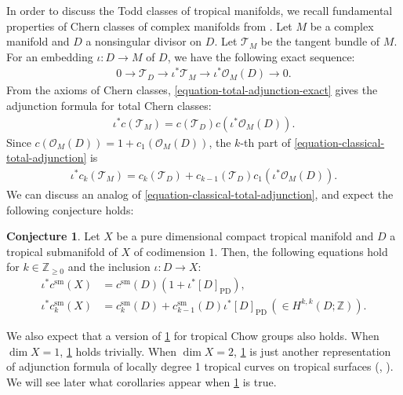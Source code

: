 \documentclass[a4paper,dvipdfmx,reqno,12pt]{amsart}
\theoremstyle{definition}
\newtheorem{conjecture}[theorem]{Conjecture}
\newcommand{\PD}[1]{[#1]_{\mathrm{PD}}}
\numberwithin{equation}{section}
\begin{document}
In order to discuss the Todd classes of
tropical manifolds, we recall fundamental properties
of Chern classes of complex manifolds from
\cite{MR1335917,MR1644323,MR2810322}.
Let $M$ be a complex manifold and 
$D$ a nonsingular
divisor on $D$. Let $\mathcal{T}_M$ be the tangent
bundle of $M$.
For an embedding $\iota\colon D\to M$ of
$D$, we have the following
exact sequence: 
\begin{align}
\label{equation-total-adjunction-exact}
0 \to \mathcal{T}_{D}\to \iota^{*}\mathcal{T}_M
\to \iota^{*}\mathcal{O}_M(D)\to 0.
\end{align}
From the axioms of Chern classes,
\eqref{equation-total-adjunction-exact} gives 
the adjunction formula for total Chern classes:
\begin{align}
\label{equation-classical-total-adjunction}
\iota^{*}c(\mathcal{T}_M)
=c(\mathcal{T}_{D})c(\iota^{*}\mathcal{O}_M(D)).
\end{align}
Since $c(\mathcal{O}_M(D))=1+c_1(\mathcal{O}_M(D))$, 
the $k$-th part of \eqref{equation-classical-total-adjunction}
is
\begin{align}
\label{equation-classical-total-adjunction-2}
\iota^{*}c_k(\mathcal{T}_M)
=c_{k}(\mathcal{T}_{D})+
c_{k-1}(\mathcal{T}_{D})c_1(\iota^{*}\mathcal{O}_M(D)).
\end{align}
We can discuss an analog of 
\eqref{equation-classical-total-adjunction},
and expect the following conjecture holds:
\begin{conjecture}
\label{conjecture-grr-divisor}
Let $X$ be a pure dimensional compact tropical manifold
and $D$ a tropical submanifold of $X$ of codimension $1$.
Then, the following equations hold for 
$k\in \mathbb{Z}_{\geq 0}$ and the inclusion 
$\iota\colon D \to X$:
\begin{align}
\label{equation-total-adjunction}
\iota^{*}c^{\mathrm{sm}}(X)&=c^{\mathrm{sm}}(D)
(1+\iota^{*}\PD{D}), \\ 
\iota^{*}c^{\mathrm{sm}}_k(X)&=c^{\mathrm{sm}}_k(D)+
c^{\mathrm{sm}}_{k-1}(D)\iota^{*}\PD{D} \,
(\in H^{k,k}(D;\mathbb{Z})).
\end{align}
\end{conjecture}
We also expect that a version
of \cref{conjecture-grr-divisor} for tropical
Chow groups \cite[Definition 3.30]{shaw2015tropical}
also holds.
When $\dim X=1$, \cref{conjecture-grr-divisor} holds
trivially. When $\dim X=2$,
\cref{conjecture-grr-divisor}
is just another representation of adjunction formula
of locally degree 1 tropical curves on tropical surfaces
(\cite[Theorem 6]{shaw2015tropical},
\cite[Theorem 5.2]{demedrano2023chern}).
We will see later what 
corollaries appear
when \cref{conjecture-grr-divisor} is true.  
\end{document}
